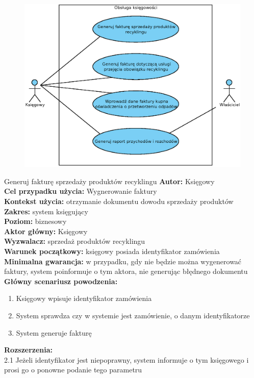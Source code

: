 \begin{figure}[H]
	\centering
	\includegraphics[width=.8\textwidth]{img/UC/ksiegowosc.eps}
\end{figure}

\begin{usecase}{Generuj fakturę sprzedaży produktów recyklingu}
	\textbf{Autor:} Księgowy\\
	\textbf{Cel przypadku użycia:} Wygnerowanie faktury \\
	\textbf{Kontekst użycia:} otrzymanie dokumentu dowodu sprzedaży produktów  \\
	\textbf{Zakres:} system księgujący \\
	\textbf{Poziom:} biznesowy \\
	\textbf{Aktor główny:} Księgowy \\
	\textbf{Wyzwalacz:} sprzedaż produktów recyklingu \\
	\textbf{Warunek początkowy:} księgowy posiada identyfikator zamówienia \\
	\textbf{Minimalna gwarancja:} w przypadku, gdy nie będzie można wygenerować faktury, system poinformuje o tym aktora, nie generując błędnego dokumentu \\
	\textbf{Główny scenariusz powodzenia:} 
		\begin{enumerate}
			\item Księgowy wpisuje identyfikator zamówienia
			\item System sprawdza czy w systemie jest zamówienie, o danym identyfikatorze
			\item System generuje fakturę 
		\end{enumerate}
	\textbf{Rozszerzenia:} \\
	2.1 Jeżeli identyfikator jest niepoprawny, system informuje o tym księgowego i prosi go o ponowne podanie tego parametru
\end{usecase}

